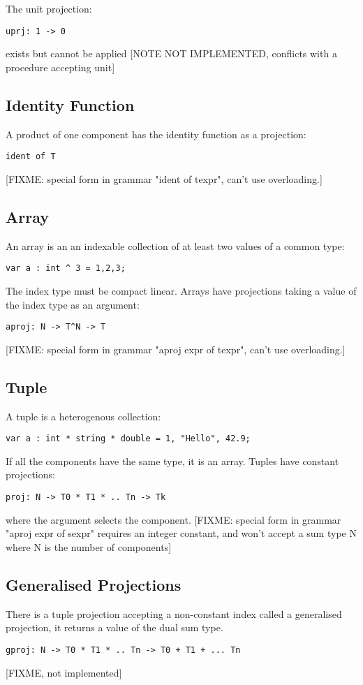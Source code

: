\documentclass[oneside]{book}
\begin{document}
The unit projection:
\begin{verbatim}
uprj: 1 -> 0
\end{verbatim}
exists but cannot be applied [NOTE NOT IMPLEMENTED, conflicts with
a procedure accepting unit]

\subsection{Identity Function}
A product of one component has the identity function as a projection:
\begin{verbatim}
ident of T
\end{verbatim}
[FIXME: special form in grammar "ident of texpr", can't use overloading.]
 
\subsection{Array}
An array is an an indexable collection of at least two values of a common type:
\begin{verbatim}
var a : int ^ 3 = 1,2,3;
\end{verbatim}
The index type must be compact linear. Arrays have projections
taking a value of the index type as an argument:
\begin{verbatim}
aproj: N -> T^N -> T
\end{verbatim}
[FIXME: special form in grammar "aproj expr of texpr", can't use overloading.]

\subsection{Tuple}
A tuple is a heterogenous collection:
\begin{verbatim}
var a : int * string * double = 1, "Hello", 42.9;
\end{verbatim}
If all the components have the same type, it is an array.
Tuples have constant projections:
\begin{verbatim}
proj: N -> T0 * T1 * .. Tn -> Tk
\end{verbatim}
where the argument selects the component.
[FIXME: special form in grammar "aproj expr of sexpr" requires an integer
constant, and won't accept a sum type N where N is the number of components]

\subsection{Generalised Projections}
There is a tuple projection accepting a non-constant index
called a generalised projection, it returns a value of the dual sum type.
\begin{verbatim}
gproj: N -> T0 * T1 * .. Tn -> T0 + T1 + ... Tn
\end{verbatim}
[FIXME, not implemented]
\end{document}
